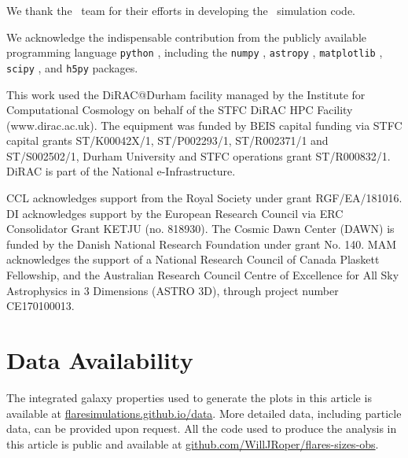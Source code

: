 \documentclass[fleqn,usenatbib]{mnras}
\newcommand{\eagle}{\mbox{\sc{Eagle}}}
\begin{document}
We thank the \eagle\ team for their efforts in developing the \eagle\ simulation code.

We acknowledge the indispensable contribution from the publicly available programming language \texttt{python} \citep{Python}, including the \texttt{numpy} \citep{numpy}, \texttt{astropy} \citep{Astropy}, \texttt{matplotlib} \citep{Matplotlib}, \texttt{scipy} \citep{2020SciPy-NMeth}, and \texttt{h5py} \citep{h5py} packages. 

This work used the DiRAC@Durham facility managed by the Institute for Computational Cosmology on behalf of the STFC DiRAC HPC Facility (www.dirac.ac.uk). The equipment was funded by BEIS capital funding via STFC capital grants ST/K00042X/1, ST/P002293/1, ST/R002371/1 and ST/S002502/1, Durham University and STFC operations grant ST/R000832/1. DiRAC is part of the National e-Infrastructure.

CCL acknowledges support from the Royal Society under grant RGF/EA/181016. DI acknowledges support by the European Research Council via ERC Consolidator Grant KETJU (no. 818930). The Cosmic Dawn Center (DAWN) is funded by the Danish National Research Foundation under grant No. 140. MAM acknowledges the support of a National Research Council of Canada Plaskett Fellowship, and the Australian Research Council Centre of Excellence for All Sky Astrophysics in 3 Dimensions (ASTRO 3D), through project number CE170100013.

\section*{Data Availability}
The integrated galaxy properties used to generate the plots in this article is available at \href{https://flaresimulations.github.io/data.html}{flaresimulations.github.io/data}. More detailed data, including particle data, can be provided upon request. All the code used to produce the analysis in this article is public and available at \href{https://github.com/WillJRoper/flares-sizes-obs}{github.com/WillJRoper/flares-sizes-obs}.










\appendix





\bsp	%
\label{lastpage}
\end{document}
